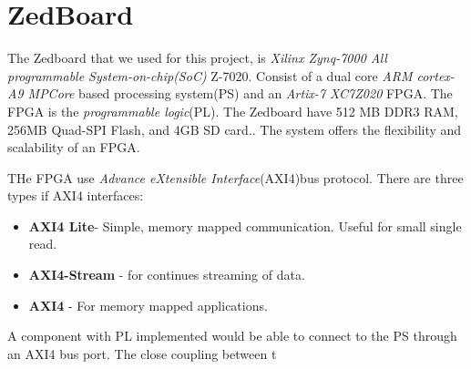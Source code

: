 \section{ZedBoard}
The Zedboard that we used for this project, is \textit{Xilinx Zynq-7000 All programmable System-on-chip(SoC)} Z-7020. Consist of a dual core \textit{ARM cortex-A9 MPCore} based processing system(PS) and an \textit{Artix-7 XC7Z020} FPGA. The FPGA is the \textit{programmable logic}(PL). The Zedboard have 512 MB DDR3 RAM, 256MB Quad-SPI Flash, and 4GB SD card.\cite{FPGASoCManual}. The system offers the flexibility and scalability of an FPGA\citep{FPGAOVERVIEW}. 

THe FPGA use \textit{Advance eXtensible Interface}(AXI4)bus protocol. There are three types if AXI4 interfaces:
\begin{itemize}
\item \textbf{AXI4 Lite}- Simple, memory mapped communication. Useful for small single read.
\item \textbf{AXI4-Stream} - for continues streaming of data.
\item \textbf{AXI4} - For memory mapped applications.
\end{itemize} 

A component with PL implemented would be able to connect to the PS through an AXI4 bus port. The close coupling between t


